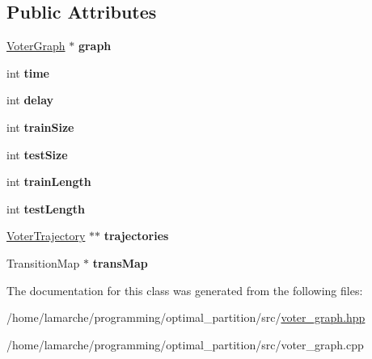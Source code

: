\subsection*{Public Attributes}
\begin{DoxyCompactItemize}
\item 
\hypertarget{classVoterDataSet_afc4d76589e0112bb5c8e30730074231e}{\hyperlink{classVoterGraph}{Voter\-Graph} $\ast$ {\bfseries graph}}\label{classVoterDataSet_afc4d76589e0112bb5c8e30730074231e}

\item 
\hypertarget{classVoterDataSet_a50a2e44a9d6d99d3254e3da816f76aff}{int {\bfseries time}}\label{classVoterDataSet_a50a2e44a9d6d99d3254e3da816f76aff}

\item 
\hypertarget{classVoterDataSet_a32c0fb1d14c53d2c10a28463f9e44a7f}{int {\bfseries delay}}\label{classVoterDataSet_a32c0fb1d14c53d2c10a28463f9e44a7f}

\item 
\hypertarget{classVoterDataSet_a8aadcc50a4094f7d43f3172c70ae5f73}{int {\bfseries train\-Size}}\label{classVoterDataSet_a8aadcc50a4094f7d43f3172c70ae5f73}

\item 
\hypertarget{classVoterDataSet_a068aae3fc53a52217cc9014ba21090dd}{int {\bfseries test\-Size}}\label{classVoterDataSet_a068aae3fc53a52217cc9014ba21090dd}

\item 
\hypertarget{classVoterDataSet_ad7cb5062b8c67a26ee50939d54027748}{int {\bfseries train\-Length}}\label{classVoterDataSet_ad7cb5062b8c67a26ee50939d54027748}

\item 
\hypertarget{classVoterDataSet_a89ce0e2c44631818736ca7f71056f6c0}{int {\bfseries test\-Length}}\label{classVoterDataSet_a89ce0e2c44631818736ca7f71056f6c0}

\item 
\hypertarget{classVoterDataSet_a07299f2883a8ec069d9821a877351725}{\hyperlink{classVoterTrajectory}{Voter\-Trajectory} $\ast$$\ast$ {\bfseries trajectories}}\label{classVoterDataSet_a07299f2883a8ec069d9821a877351725}

\item 
\hypertarget{classVoterDataSet_a0f0ee88cf6290a0a679982a5fef315b0}{Transition\-Map $\ast$ {\bfseries trans\-Map}}\label{classVoterDataSet_a0f0ee88cf6290a0a679982a5fef315b0}

\end{DoxyCompactItemize}


The documentation for this class was generated from the following files\-:\begin{DoxyCompactItemize}
\item 
/home/lamarche/programming/optimal\-\_\-partition/src/\hyperlink{voter__graph_8hpp}{voter\-\_\-graph.\-hpp}\item 
/home/lamarche/programming/optimal\-\_\-partition/src/voter\-\_\-graph.\-cpp\end{DoxyCompactItemize}
